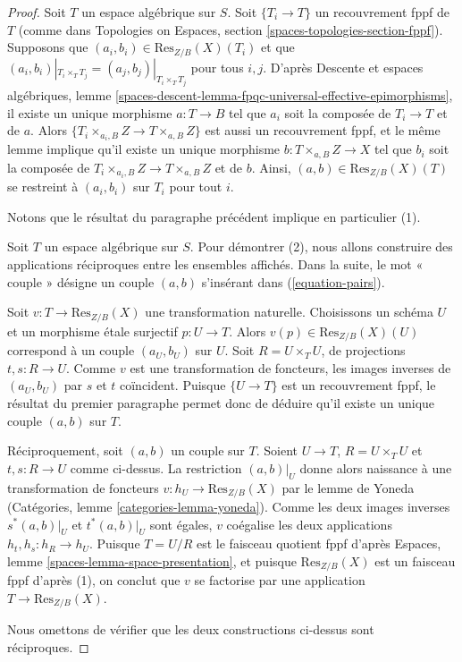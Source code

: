 \begin{proof}
Soit $T$ un espace algébrique sur $S$. Soit $\{T_i \to T\}$ un
recouvrement fppf de $T$ (comme dans
Topologies on Espaces, section \ref{spaces-topologies-section-fppf}).
Supposons que $(a_i, b_i) \in \text{Res}_{Z/B}(X)(T_i)$ et
que $(a_i, b_i)|_{T_i \times_T T_j} = (a_j, b_j)|_{T_i \times_T T_j}$
pour tous $i, j$. D'après
Descente et espaces algébriques,
lemme \ref{spaces-descent-lemma-fpqc-universal-effective-epimorphisms},
il existe un unique morphisme $a : T \to B$ tel que $a_i$ soit la
composée de $T_i \to T$ et de $a$. Alors
$\{T_i \times_{a_i, B} Z \to T \times_{a, B} Z\}$ est aussi un recouvrement
fppf, et le même lemme implique qu'il existe un unique morphisme
$b : T \times_{a, B} Z \to X$ tel que $b_i$ soit la composée
de $T_i \times_{a_i, B} Z \to T \times_{a, B} Z$ et de $b$. Ainsi,
$(a, b) \in \text{Res}_{Z/B}(X)(T)$ se restreint à $(a_i, b_i)$
sur $T_i$ pour tout $i$.

\medskip\noindent
Notons que le résultat du paragraphe précédent implique en particulier (1).

\medskip\noindent
Soit $T$ un espace algébrique sur $S$. Pour démontrer (2), nous allons
construire des applications réciproques entre les ensembles affichés. Dans la
suite, le mot « couple » désigne un couple $(a, b)$ s'insérant
dans (\ref{equation-pairs}).

\medskip\noindent
Soit $v : T \to \text{Res}_{Z/B}(X)$ une transformation naturelle.
Choisissons un schéma $U$ et un morphisme étale surjectif $p : U \to T$.
Alors $v(p) \in \text{Res}_{Z/B}(X)(U)$ correspond à un couple $(a_U, b_U)$
sur $U$. Soit $R = U \times_T U$, de projections $t, s : R \to U$.
Comme $v$ est une transformation de foncteurs, les images inverses de
$(a_U, b_U)$ par $s$ et $t$ coïncident. Puisque $\{U \to T\}$ est un
recouvrement fppf, le résultat du premier paragraphe permet donc de
déduire qu'il existe un unique couple $(a, b)$ sur $T$.

\medskip\noindent
Réciproquement, soit $(a, b)$ un couple sur $T$.
Soient $U \to T$, $R = U \times_T U$ et $t, s : R \to U$ comme
ci-dessus. La restriction $(a, b)|_U$ donne alors naissance à une
transformation de foncteurs $v : h_U \to \text{Res}_{Z/B}(X)$ par le
lemme de Yoneda
(Catégories, lemme \ref{categories-lemma-yoneda}).
Comme les deux images inverses $s^*(a, b)|_U$ et $t^*(a, b)|_U$
sont égales, $v$ coégalise les deux applications
$h_t, h_s : h_R \to h_U$. Puisque $T = U/R$ est le faisceau quotient fppf d'après
Espaces, lemme \ref{spaces-lemma-space-presentation},
et puisque $\text{Res}_{Z/B}(X)$ est un faisceau fppf d'après (1), on conclut
que $v$ se factorise par une application $T \to \text{Res}_{Z/B}(X)$.

\medskip\noindent
Nous omettons de vérifier que les deux constructions ci-dessus sont
réciproques.
\end{proof}

